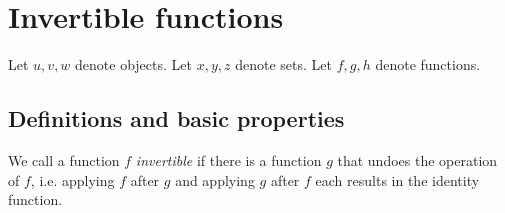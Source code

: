 \documentclass[../../set-theory.ftl.tex]{subfiles}
\begin{document}
  \begin{comment}
    \begin{forthel}

    \end{forthel}
  \end{comment}


  \section{Invertible functions}

  \begin{forthel}
  \end{forthel}

  \begin{forthel}
    Let $u,v,w$ denote objects.
    Let $x,y,z$ denote sets.
    Let $f,g,h$ denote functions.
  \end{forthel}


  \subsection{Definitions and basic properties}

  We call a function $f$ \textit{invertible} if there is a function $g$ that
  undoes the operation of $f$, i.e. applying $f$ after $g$ and applying $g$
  after $f$ each results in the identity function.
\end{document}
